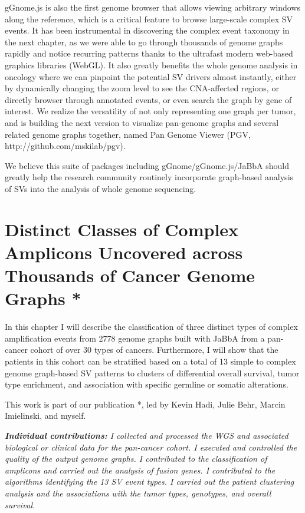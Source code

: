 \documentclass[phd,tocprelim]{cornell}
\begin{document}
gGnome.js is also the first genome browser that allows viewing arbitrary windows along the reference, which is a critical feature to browse large-scale complex SV events. It has been instrumental in discovering the complex event taxonomy in the next chapter, as we were able to go through thousands of genome graphs rapidly and notice recurring patterns thanks to the ultrafast modern web-based graphics libraries (WebGL). It also greatly benefits the whole genome analysis in oncology where we can pinpoint the potential SV drivers almost instantly, either by dynamically changing the zoom level to see the CNA-affected regions, or directly browser through annotated events, or even search the graph by gene of interest. We realize the versatility of not only representing one graph per tumor, and is building the next version to visualize pan-genome graphs and several related genome graphs together, named Pan Genome Viewer (PGV, http://github.com/mskilab/pgv).

We believe this suite of packages including gGnome/gGnome.js/JaBbA should greatly help the research community routinely incorporate graph-based analysis of SVs into the analysis of whole genome sequencing.

\chapter{Distinct Classes of Complex Amplicons Uncovered across Thousands of Cancer Genome Graphs *} \label{chap:complex_events}
In this chapter I will describe the classification of three distinct types of complex amplification events from 2778 genome graphs built with JaBbA from a pan-cancer cohort of over 30 types of cancers. Furthermore, I will show that the patients in this cohort can be stratified based on a total of 13 simple to complex genome graph-based SV patterns to clusters of differential overall survival, tumor type enrichment, and association with specific germline or somatic alterations.

This work is part of our publication \cite{Hadi2020-um}*, led by Kevin Hadi, Julie Behr, Marcin Imielinski, and myself.

\textit{
    \textbf{Individual contributions:} I collected and processed the WGS and associated biological or clinical data for the pan-cancer cohort. I executed and controlled the quality of the output genome graphs. I contributed to the classification of amplicons and carried out the analysis of fusion genes. I contributed to the algorithms identifying the 13 SV event types. I carried out the patient clustering analysis and the associations with the tumor types, genotypes, and overall survival.
}
\end{document}
